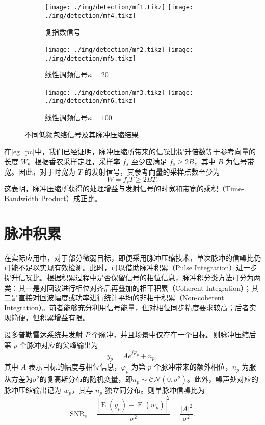 \begin{figure}[htb!]
    \centering
    \begin{subfigure}{.3\textwidth}
        \centering
        \texttt{[image: ./img/detection/mf1.tikz]}
        \texttt{[image: ./img/detection/mf4.tikz]}
        \caption{复指数信号}
        \label{fig_mf_1}
    \end{subfigure}
    \begin{subfigure}{.3\textwidth}
        \centering
        \texttt{[image: ./img/detection/mf2.tikz]}
        \texttt{[image: ./img/detection/mf5.tikz]}
        \caption{线性调频信号\( \kappa = 20 \)}
        \label{fig_mf_2}
    \end{subfigure}
    \begin{subfigure}{.3\textwidth}
        \centering
        \texttt{[image: ./img/detection/mf3.tikz]}
        \texttt{[image: ./img/detection/mf6.tikz]}
        \caption{线性调频信号\( \kappa=100 \)}
        \label{fig_mf_3}
    \end{subfigure}
    \caption{不同低频包络信号及其脉冲压缩结果}
    \label{fig_mf}
\end{figure}

在\cref{eg_pc}中，我们已经证明，脉冲压缩所带来的信噪比提升倍数等于参考向量的长度 \(W\)。根据香农采样定理，采样率 \(f_s\) 至少应满足 \(f_s \geq 2B\)，其中 \(B\) 为信号带宽。因此，对于时宽为 \(T\) 的发射信号，其参考向量的采样点数至少为
\[
    W = f_s T \geq 2BT.
\]
这表明，脉冲压缩所获得的处理增益与发射信号的时宽和带宽的乘积（Time-Bandwidth Product）成正比。

\section{脉冲积累}
在实际应用中，对于部分微弱目标，即便采用脉冲压缩技术，单次脉冲的信噪比仍可能不足以实现有效检测。此时，可以借助脉冲积累（Pulse Integration）进一步提升信噪比。根据积累过程中是否保留信号的相位信息，脉冲积分类方法可分为两类：其一是对回波进行相位对齐后再叠加的相干积累（Coherent Integration）；其二是直接对回波幅度或功率进行统计平均的非相干积累（Non-coherent Integration）。前者能够充分利用信号能量，但对相位同步精度要求较高；后者实现简便，但积累增益有限。

设多普勒雷达系统共发射 \( P \) 个脉冲，并且场景中仅存在一个目标。则脉冲压缩后第 \( p \) 个脉冲对应的尖峰输出为
\[
    y_p = A e^{j \varphi_p} + n_p,
\]
其中 \( A \) 表示目标的幅度与相位信息，\(\varphi_p\) 为第 \( p \) 个脉冲带来的额外相位，\( n_p \) 为服从方差为\( \sigma^2 \)的复高斯分布的随机变量，即\( n_p \sim \mathcal{CN}(0,\sigma^2) \)。此外，噪声处对应的脉冲压缩输出记为 \( w_p \)，其与 \( n_p \) 独立同分布。则单脉冲信噪比为
\[
    \mathrm{SNR}_s
    = \frac{\left| \operatorname{E}(y_p) - \operatorname{E}(w_p) \right|^2}{\sigma^2}
    = \frac{|A|^2}{\sigma^2}.
\]

